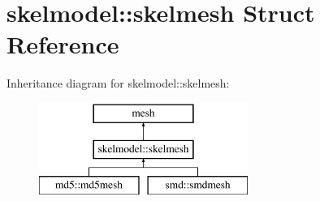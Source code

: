 \hypertarget{structskelmodel_1_1skelmesh}{}\section{skelmodel\+:\+:skelmesh Struct Reference}
\label{structskelmodel_1_1skelmesh}
Inheritance diagram for skelmodel\+:\+:skelmesh\+:\begin{figure}[H]
\begin{center}
\leavevmode
\includegraphics[height=3.000000cm]{structskelmodel_1_1skelmesh}
\end{center}
\end{figure}
